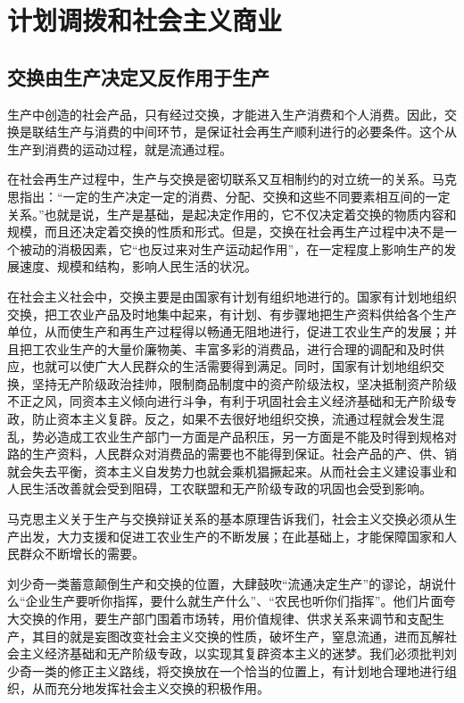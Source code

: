 \documentclass{book}
\begin{document}
\section{计划调拨和社会主义商业}

\subsection{交换由生产决定又反作用于生产}

生产中创造的社会产品，只有经过交换，才能进入生产消费和个人消费。因此，交换是联结生产与消费的中间环节，是保证社会再生产顺利进行的必要条件。这个从生产到消费的运动过程，就是流通过程。

在社会再生产过程中，生产与交换是密切联系又互相制约的对立统一的关系。马克思指出：“一定的生产决定一定的消费、分配、交换和这些不同要素相互间的一定关系。”也就是说，生产是基础，是起决定作用的，它不仅决定着交换的物质内容和规模，而且还决定着交换的性质和形式。但是，交换在社会再生产过程中决不是一个被动的消极因素，它“也反过来对生产运动起作用”，在一定程度上影响生产的发展速度、规模和结构，影响人民生活的状况。

在社会主义社会中，交换主要是由国家有计划有组织地进行的。国家有计划地组织交换，把工农业产品及时地集中起来，有计划、有步骤地把生产资料供给各个生产单位，从而使生产和再生产过程得以畅通无阻地进行，促进工农业生产的发展；并且把工农业生产的大量价廉物美、丰富多彩的消费品，进行合理的调配和及时供应，也就可以使广大人民群众的生活需要得到满足。同时，国家有计划地组织交换，坚持无产阶级政治挂帅，限制商品制度中的资产阶级法权，坚决抵制资产阶级不正之风，同资本主义倾向进行斗争，有利于巩固社会主义经济基础和无产阶级专政，防止资本主义复辟。反之，如果不去很好地组织交换，流通过程就会发生混乱，势必造成工农业生产部门一方面是产品积压，另一方面是不能及时得到规格对路的生产资料，人民群众对消费品的需要也不能得到保证。社会产品的产、供、销就会失去平衡，资本主义自发势力也就会乘机猖撅起来。从而社会主义建设事业和人民生活改善就会受到阻碍，工农联盟和无产阶级专政的巩固也会受到影响。

马克思主义关于生产与交换辩证关系的基本原理告诉我们，社会主义交换必须从生产出发，大力支援和促进工农业生产的不断发展；在此基础上，才能保障国家和人民群众不断增长的需要。

刘少奇一类蓄意颠倒生产和交换的位置，大肆鼓吹“流通决定生产”的谬论，胡说什么“企业生产要听你指挥，要什么就生产什么”、“农民也听你们指挥”。他们片面夸大交换的作用，要生产部门围着市场转，用价值规律、供求关系来调节和支配生产，其目的就是妄图改变社会主义交换的性质，破坏生产，窒息流通，进而瓦解社会主义经济基础和无产阶级专政，以实现其复辟资本主义的迷梦。我们必须批判刘少奇一类的修正主义路线，将交换放在一个恰当的位置上，有计划地合理地进行组织，从而充分地发挥社会主义交换的积极作用。
\end{document}

